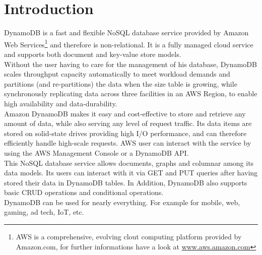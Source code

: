 \chapter{Introduction}
\label{cha:Introduction}

DynamoDB is a fast and flexible NoSQL database service provided by Amazon Web Services\footnote{AWS is a comprehensive, evolving clout computing platform provided by Amazon.com, for further informations have a look at \href{https://aws.amazon.com}{www.aws.amazon.com}} and therefore is non-relational. It is a fully managed cloud service and supports both document and key-value store models. \cite{techtarget} \\

Without the user having to care for the management of his database, DynamoDB scales throughput capacity automatically to meet workload demands and partitions (and re-partitions) the data when the size table is growing, while synchronously replicating data across three facilities in an AWS Region, to enable high availability and data-durability. \\

Amazon DynamoDB makes it easy and cost-effective to store and retrieve any amount of data, while also serving any level of request traffic. Its data items are stored on solid-state drives providing high I/O performance, and can therefore efficiently handle high-scale requests. AWS user can interact with the service by using the AWS Management Console or a DynamoDB API. \\

This NoSQL database service allows documents, graphs and columnar among its data models. Its users can interact with it via GET and PUT queries after having stored their data in DynamoDB tables. In Addition, DynamoDB also supports basic CRUD operations and conditional operations.\\

DynamoDB can be used for nearly everything. For example for mobile, web, gaming, ad tech, IoT, etc.\\
